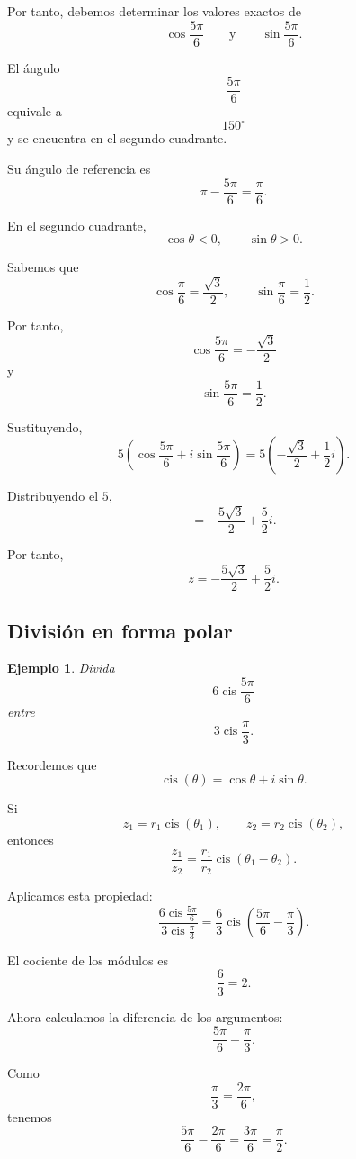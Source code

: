 \documentclass[12pt]{article}
\newtheorem{Ejem}{Ejemplo}
\begin{document}
Por tanto, debemos determinar los valores exactos de
\[
\cos\frac{5\pi}{6}
\qquad\text{y}\qquad
\sin\frac{5\pi}{6}.
\]

El ángulo
\[
\frac{5\pi}{6}
\]
equivale a
\[
150^\circ
\]
y se encuentra en el segundo cuadrante.

Su ángulo de referencia es
\[
\pi-\frac{5\pi}{6}
=
\frac{\pi}{6}.
\]

En el segundo cuadrante,
\[
\cos\theta<0,
\qquad
\sin\theta>0.
\]

Sabemos que
\[
\cos\frac{\pi}{6}
=
\frac{\sqrt3}{2},
\qquad
\sin\frac{\pi}{6}
=
\frac12.
\]

Por tanto,
\[
\cos\frac{5\pi}{6}
=
-\frac{\sqrt3}{2}
\]
y
\[
\sin\frac{5\pi}{6}
=
\frac12.
\]

Sustituyendo,
\[
5\left(
\cos\frac{5\pi}{6}
+i\sin\frac{5\pi}{6}
\right)
=
5\left(
-\frac{\sqrt3}{2}
+\frac12i
\right).
\]

Distribuyendo el $5$,
\[
=-\frac{5\sqrt3}{2}
+\frac52i.
\]

Por tanto,
\[
\boxed{
z=-\frac{5\sqrt3}{2}+\frac52i
}.
\]

\subsection{División en forma polar}

\begin{Ejem}
Divida
\[
6\operatorname{cis}\frac{5\pi}{6}
\]
entre
\[
3\operatorname{cis}\frac{\pi}{3}.
\]
\end{Ejem}

Recordemos que
\[
\operatorname{cis}(\theta)
=
\cos\theta+i\sin\theta.
\]

Si
\[
z_1=r_1\operatorname{cis}(\theta_1),
\qquad
z_2=r_2\operatorname{cis}(\theta_2),
\]
entonces
\[
\frac{z_1}{z_2}
=
\frac{r_1}{r_2}
\operatorname{cis}(\theta_1-\theta_2).
\]

Aplicamos esta propiedad:
\[
\frac{
6\operatorname{cis}\frac{5\pi}{6}
}{
3\operatorname{cis}\frac{\pi}{3}
}
=
\frac63
\operatorname{cis}
\left(
\frac{5\pi}{6}-\frac{\pi}{3}
\right).
\]

El cociente de los módulos es
\[
\frac63=2.
\]

Ahora calculamos la diferencia de los argumentos:
\[
\frac{5\pi}{6}-\frac{\pi}{3}.
\]

Como
\[
\frac{\pi}{3}=\frac{2\pi}{6},
\]
tenemos
\[
\frac{5\pi}{6}-\frac{2\pi}{6}
=
\frac{3\pi}{6}
=
\frac{\pi}{2}.
\]
\end{document}
